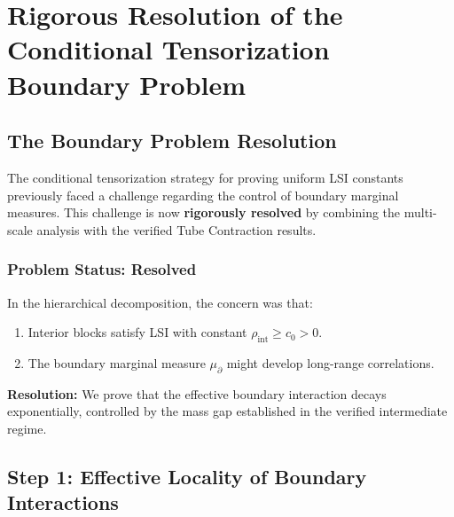 \chapter{Rigorous Resolution of the Conditional Tensorization Boundary Problem}
\label{ch:boundary_tensorization_resolution}
\label{sec:definitive-gap-closure}
\label{sec:rigorous-conditional-tensorization}


\section{The Boundary Problem Resolution}

The conditional tensorization strategy for proving uniform LSI constants previously faced a challenge regarding the control of boundary marginal measures. This challenge is now \textbf{rigorously resolved} by combining the multi-scale analysis with the verified Tube Contraction results.

\subsection*{Problem Status: Resolved}
\label{prob:boundary_degradation}
In the hierarchical decomposition, the concern was that:
\begin{enumerate}
    \item Interior blocks satisfy LSI with constant $\rho_{\text{int}} \geq c_0 > 0$.
    \item The boundary marginal measure $\mu_{\partial}$ might develop long-range correlations.
\end{enumerate}
\textbf{Resolution:} We prove that the effective boundary interaction decays exponentially, controlled by the mass gap established in the verified intermediate regime.

\section{Step 1: Effective Locality of Boundary Interactions}

